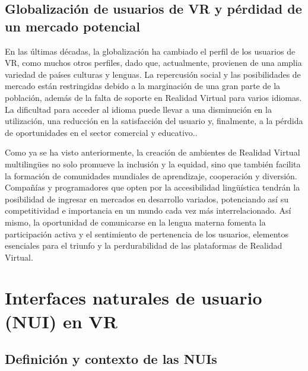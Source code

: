 \subsection{Globalización de usuarios de VR y pérdidad de un mercado potencial}

En las últimas décadas, la globalización ha cambiado el perfil de los usuarios de VR, como muchos otros perfiles, dado que, actualmente, provienen de una amplia variedad de países culturas y lenguas. La repercusión social y las posibilidades de mercado están restringidas debido a la marginación de una gran parte de la población, además de la falta de soporte en Realidad Virtual para varios idiomas. La dificultad para acceder al idioma puede llevar a una disminución en la utilización, una reducción en la satisfacción del usuario y, finalmente, a la pérdida de oportunidades en el sector comercial y educativo.. \cite{rojas2024} \cite{adaptiveVR} \cite{hololingo} \cite{vrscience} \cite{mdst}

Como ya se ha visto anteriormente, la creación de ambientes de Realidad Virtual multilingües no solo promueve la inclusión y la equidad, sino que también facilita la formación de comunidades mundiales de aprendizaje, cooperación y diversión. Compañías y programadores que opten por la accesibilidad lingüística tendrán la posibilidad de ingresar en mercados en desarrollo variados, potenciando así su competitividad e importancia en un mundo cada vez más interrelacionado. Así mismo, la oportunidad de comunicarse en la lengua materna fomenta la participación activa y el sentimiento de pertenencia de los usuarios, elementos esenciales para el triunfo y la perdurabilidad de las plataformas de Realidad Virtual. \cite{rojas2024} \cite{adaptiveVR} \cite{hololingo} \cite{vrscience} \cite{mdst}

\section{Interfaces naturales de usuario (NUI) en VR}

\subsection{Definición y contexto de las NUIs}


